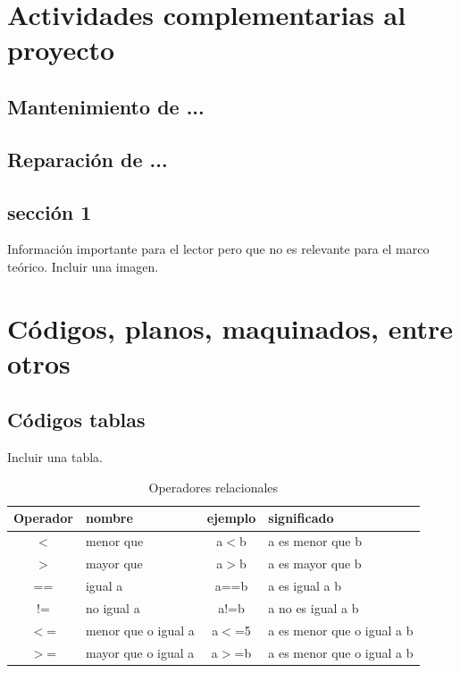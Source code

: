 \appendix
\chapter{Actividades complementarias al proyecto}

\section{Mantenimiento de ...}
\noindent

\section{Reparación de ...}
\noindent

\section{sección 1}
\noindent
Información importante para el lector pero que no es relevante para el marco teórico.
\noindent
Incluir una imagen.



\chapter{Códigos, planos, maquinados, entre otros}
\section{Códigos tablas}
Incluir una tabla.

\begin{table}[htp]
	\caption{Operadores relacionales}
	\begin{center}
		\begin{tabular}{|| c | l | c | l ||}
			\hline
			\hline
			Operador & nombre & ejemplo & significado\\
			\hline
			$<$ & menor que & a$<$b & a es menor que b\\
			\hline
			$>$ & mayor que & a$>$b & a es mayor que b\\
			\hline
			== & igual a & a==b & a es igual a b\\
			\hline
			!= & no igual a & a!=b & a no es igual a b\\
			\hline
			$<$= & menor que o igual a & a$<$=5 & a es menor que o igual a b\\
			\hline
			$>$= & mayor que o igual a & a$>$=b & a es menor que o igual a b\\
			\hline
		\end{tabular}
	\end{center}
\label{table_2-6}
\end{table}

